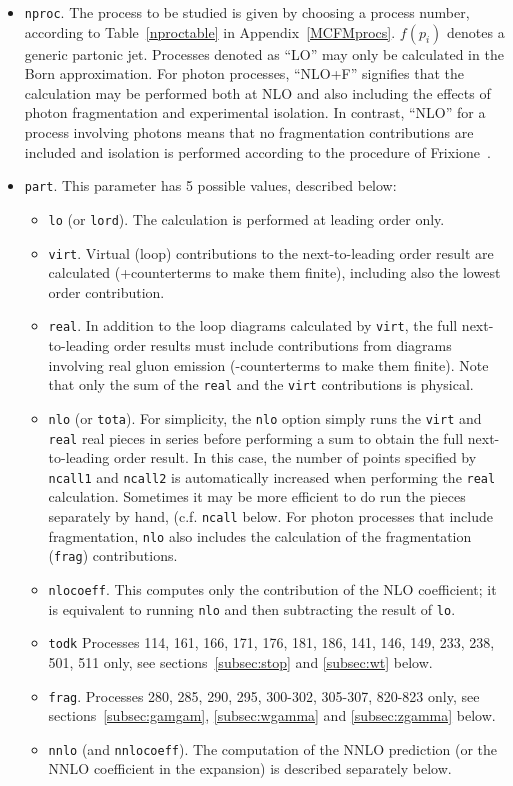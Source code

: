 \documentclass[12pt]{article}
\begin{document}
\begin{itemize}
\begin{center}
\{blank line\} \\
{\tt [General options to specify the process and execution] }
\end{center}

\item {\tt nproc}.
The process to be studied is given by
choosing a process number, according to Table~\ref{nproctable}
in Appendix~\ref{MCFMprocs}.
$f(p_i)$ denotes a generic partonic jet. Processes denoted as
``LO'' may only be calculated in the Born approximation. For photon
processes, ``NLO+F'' signifies that the calculation may be performed
both at NLO and also including the effects of photon fragmentation
and experimental isolation. In contrast, ``NLO'' for a process involving
photons means that no fragmentation contributions are included and isolation
is performed according to the procedure of Frixione~\cite{Frixione:1998jh}.
\item {\tt part}.
This parameter has 5 possible values, described below:
\begin{itemize}
\item {\tt lo} (or {\tt lord}).
The calculation is performed at leading order only.
\item {\tt virt}.
Virtual (loop) contributions to the next-to-leading order result are
calculated (+counterterms to make them finite), including also the
lowest order contribution.
\item {\tt real}.
In addition to the loop diagrams calculated by {\tt virt}, the full
next-to-leading order results must include contributions from diagrams
involving real gluon emission (-counterterms to make them finite).
Note that only the sum of the {\tt real} and the {\tt virt} contributions
is physical.
\item {\tt nlo} (or {\tt tota}).
For simplicity, the {\tt nlo} option simply runs the {\tt virt} and
{\tt real} real pieces in series before performing a sum to obtain
the full next-to-leading order result. In this case, the number of
points specified by {\tt ncall1} and {\tt ncall2} is automatically
increased when performing the {\tt real} calculation. Sometimes
it may be more efficient to do run the pieces separately by hand, 
(c.f. {\tt ncall} below. For photon processes that include fragmentation,
{\tt nlo} also includes the calculation of the fragmentation ({\tt frag})
contributions.
\item {\tt nlocoeff}.
This computes only the contribution of the NLO coefficient;  it is equivalent
to running {\tt nlo} and then subtracting the result of {\tt lo}.
\item {\tt todk}
Processes 114, 161, 166, 171, 176, 181, 186, 141, 146, 149, 233, 238, 501, 511 only, see sections~\ref{subsec:stop} and
\ref{subsec:wt} below.
\item {\tt frag}.
Processes 280, 285, 290, 295, 300-302, 305-307,  820-823 only, see sections~\ref{subsec:gamgam}, \ref{subsec:wgamma} and
\ref{subsec:zgamma} below.
\item {\tt nnlo} (and {\tt nnlocoeff}).
The computation of the NNLO prediction (or the NNLO coefficient in the
expansion) is described separately below.
\end{itemize}


\end{itemize}
\end{document}
